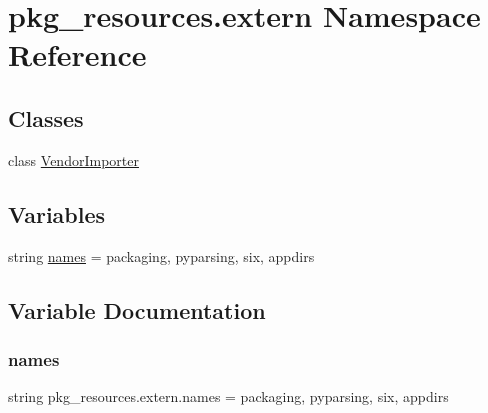 \hypertarget{namespacepkg__resources_1_1extern}{}\section{pkg\+\_\+resources.\+extern Namespace Reference}
\label{namespacepkg__resources_1_1extern}
\subsection*{Classes}
\begin{DoxyCompactItemize}
\item 
class \hyperlink{classpkg__resources_1_1extern_1_1_vendor_importer}{Vendor\+Importer}
\end{DoxyCompactItemize}
\subsection*{Variables}
\begin{DoxyCompactItemize}
\item 
string \hyperlink{namespacepkg__resources_1_1extern_a648c9287c48f62e9c388e216b4d18a0d}{names} = \textquotesingle{}packaging\textquotesingle{}, \textquotesingle{}pyparsing\textquotesingle{}, \textquotesingle{}six\textquotesingle{}, \textquotesingle{}appdirs\textquotesingle{}
\end{DoxyCompactItemize}


\subsection{Variable Documentation}
\mbox{\label{namespacepkg__resources_1_1extern_a648c9287c48f62e9c388e216b4d18a0d}} 
\subsubsection{\texorpdfstring{names}{names}}
{\footnotesize\ttfamily string pkg\+\_\+resources.\+extern.\+names = \textquotesingle{}packaging\textquotesingle{}, \textquotesingle{}pyparsing\textquotesingle{}, \textquotesingle{}six\textquotesingle{}, \textquotesingle{}appdirs\textquotesingle{}}


